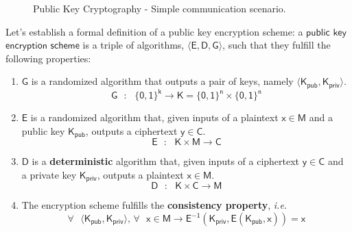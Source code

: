 \documentclass{article}
\newcounter{definition}[section]
\begin{document}
\begin{figure}
    \centering
    \caption{Public Key Cryptography - Simple communication scenario.}
    \label{fig:pub_key_scenario}
\end{figure}

\par \noindent Let's establish a formal definition of a public key encryption scheme: a $\mathsf{public}$ $\mathsf{key}$ $\mathsf{encryption}$ $\mathsf{scheme}$ is a triple of algorithms, $\mathsf{\langle E, D, G\rangle}$, such that they fulfill the following properties:

\begin{enumerate}
    \item $\mathsf{G}$ is a randomized algorithm that outputs a pair of keys, namely $\mathsf{\langle K_{pub}, K_{priv} \rangle}$.
    $$
        \mathsf{G \text{ } : \text{ } \{0,1\}^{k} \rightarrow K = \{0,1\}^{n} \times \{0,1\}^{n}}
    $$
    \item $\mathsf{E}$ is a randomized algorithm that, given inputs of a plaintext $\mathsf{x \in M}$ and a public key $\mathsf{K_{pub}}$, outputs a ciphertext $\mathsf{y \in C}$.
    $$
    \mathsf{E \text{ } : \text{ } K \times M \rightarrow C}
    $$
    \item $\mathsf{D}$ is a \textbf{deterministic} algorithm that, given inputs of a ciphertext $\mathsf{y \in C}$ and a private key $\mathsf{K_{priv}}$, outputs a plaintext $\mathsf{x \in M}$.
    $$
    \mathsf{D \text{ } : \text{ } K \times C \rightarrow M}
    $$
    \item The encryption scheme fulfills the \textbf{consistency property}, \textit{i.e.}
    $$
        \mathsf{\forall \text{ } \langle K_{pub}, K_{priv} \rangle \text{, } \forall \text{ } x \in M \rightarrow E^{-1}(K_{priv}, E(K_{pub}, x)) = x}
    $$
\end{enumerate}
\end{document}
